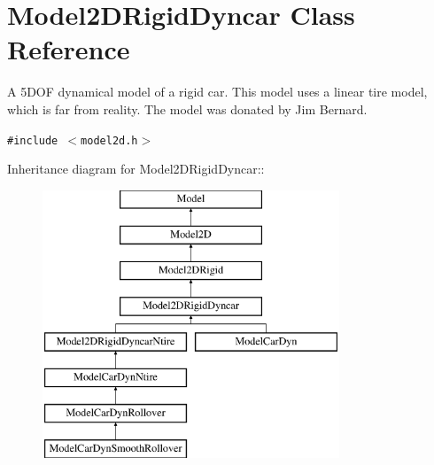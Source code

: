 \section{Model2DRigid\-Dyncar  Class Reference}
\label{classModel2DRigidDyncar}
A 5DOF dynamical model of a rigid car. This model uses a linear tire model, which is far from reality. The model was donated by Jim Bernard. 


{\tt \#include $<$model2d.h$>$}

Inheritance diagram for Model2DRigid\-Dyncar::\begin{figure}[H]
\begin{center}
\leavevmode
\includegraphics[height=8cm]{classModel2DRigidDyncar}
\end{center}
\end{figure}
